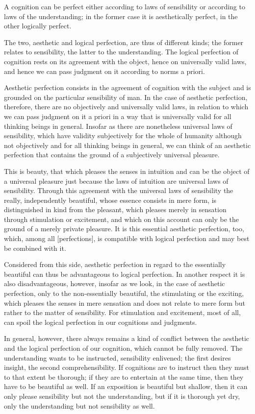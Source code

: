 A cognition can be perfect either
according to laws of sensibility or
according to laws of the understanding;
in the former case it is aesthetically perfect,
in the other logically perfect.

The two, aesthetic and logical perfection, are thus of different kinds;
the former relates to sensibility, the latter to the understanding.
The logical perfection of cognition rests on its agreement with the object,
hence on universally valid laws, and hence we
can pass judgment on it according to norms a priori.

Aesthetic perfection consists in the agreement of cognition with the subject and is grounded on
the particular sensibility of man.
In the case of aesthetic perfection, therefore,
there are no objectively and universally valid laws, in relation to
which we can pass judgment on it a priori in a way that is universally valid
for all thinking beings in general.
Insofar as there are nonetheless universal laws of sensibility,
which have validity subjectively for the whole of humanity
although not objectively and for all thinking beings in general,
we can think of an aesthetic perfection that contains the ground of a
subjectively universal pleasure.

This is beauty, that which pleases the senses in intuition and
can be the object of a universal pleasure just because
the laws of intuition are universal laws of sensibility.
Through this agreement with the universal laws of sensibility
the really, independently beautiful,
whose essence consists in mere form,
is distinguished in kind from the pleasant,
which pleases merely in sensation
through stimulation or excitement,
and which on this account can only be
the ground of a merely private pleasure.
It is this essential aesthetic perfection, too,
which, among all [perfections], is compatible with
logical perfection and may best be combined with it.

    Considered from this side, aesthetic perfection in regard to the essentially
    beautiful can thus be advantageous to logical perfection. In another
    respect it is also disadvantageous, however, insofar as we look, in the case
    of aesthetic perfection, only to the non-essentially beautiful, the stimulating
    or the exciting, which pleases the senses in mere sensation and does not
    relate to mere form but rather to the matter of sensibility. For stimulation
    and excitement, most of all, can spoil the logical perfection in our
    cognitions and judgments.

    In general, however, there always remains a kind of conflict between the
    aesthetic and the logical perfection of our cognition, which cannot be fully
    removed. The understanding wants to be instructed, sensibility enlivened;
    the first desires insight, the second comprehensibility. If cognitions are to
    instruct then they must to that extent be thorough; if they are to entertain
    at the same time, then they have to be beautiful as well. If an exposition is
    beautiful but shallow, then it can only please sensibility but not the understanding,
    but if it is thorough yet dry, only the understanding but not
    sensibility as well.


